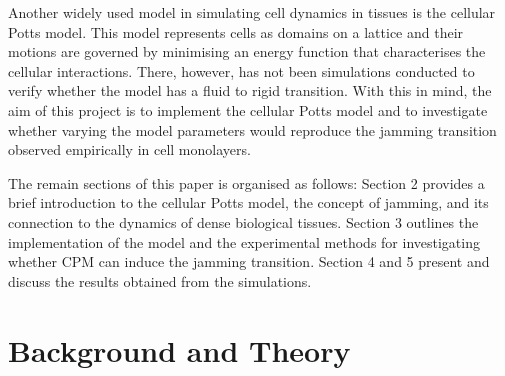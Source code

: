 \documentclass[a4paper,12pt]{article}
\begin{document}
Another widely used model in simulating cell dynamics in tissues is the cellular Potts model. This model represents cells as domains on a lattice and their motions are governed by minimising an energy function that characterises the cellular interactions. There, however, has not been simulations conducted to verify whether the model has a fluid to rigid transition. With this in mind, the aim of this project is to implement the cellular Potts model and to investigate whether varying the model parameters would reproduce the jamming transition observed empirically in cell monolayers. 

The remain sections of this paper is organised as follows: Section 2 provides a brief introduction to the cellular Potts model, the concept of jamming, and its connection to the dynamics of dense biological tissues. Section 3 outlines the implementation of the model and the experimental methods for investigating whether CPM can induce the jamming transition. Section 4 and 5 present and discuss the results obtained from the simulations. 


%


\section{Background and Theory}

%
%
\end{document}
